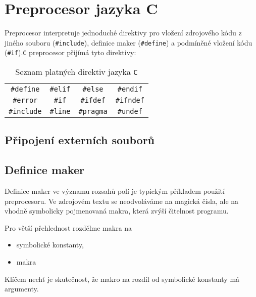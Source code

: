 \chapter{Preprocesor jazyka C}
\minitoc
\newpage
  Preprocesor interpretuje jednoduché direktivy pro vložení zdrojového kódu z jiného souboru (\lstinline[basicstyle=\ttfamily]!#include!), definice maker (\lstinline[basicstyle=\ttfamily]!#define!) a podmíněné vložení kódu (\lstinline[basicstyle=\ttfamily]!#if!).\texttt{C} preprocesor přijímá tyto direktivy:
  
  \begin{table}[ht!]
    \centering
    \begin{tabular}{c c c c}
      \hline
      \lstinline[basicstyle=\ttfamily]!#define! & \lstinline[basicstyle=\ttfamily]!#elif! & \lstinline[basicstyle=\ttfamily]!#else! & \lstinline[basicstyle=\ttfamily]!#endif! \\
      \lstinline[basicstyle=\ttfamily]!#error! & \lstinline[basicstyle=\ttfamily]!#if! & \lstinline[basicstyle=\ttfamily]!#ifdef! & \lstinline[basicstyle=\ttfamily]!#ifndef! \\
      \lstinline[basicstyle=\ttfamily]!#include! & \lstinline[basicstyle=\ttfamily]!#line! & \lstinline[basicstyle=\ttfamily]!#pragma! & \lstinline[basicstyle=\ttfamily]!#undef! \\
      \hline            
    \end{tabular}
    \caption{Seznam platných direktiv jazyka \texttt{C}}\label{S4101C1:C_tab_direktiva}
  \end{table} 
  
 \section{Připojení externích souborů}
 
 \section{Definice maker}
   Definice maker ve významu rozsahů polí je typickým příkladem použití preprocesoru. Ve zdrojovém textu se neodvoláváme na magická čísla, ale na vhodně symbolicky pojmenovaná makra, která zvýší čitelnost programu.

   Pro větší přehlednost rozdělme makra na 
   \begin{itemize}
     \item symbolické konstanty,
     \item makra
   \end{itemize}
   Klíčem nechť je skutečnost, že makro na rozdíl od symbolické konstanty má argumenty.
